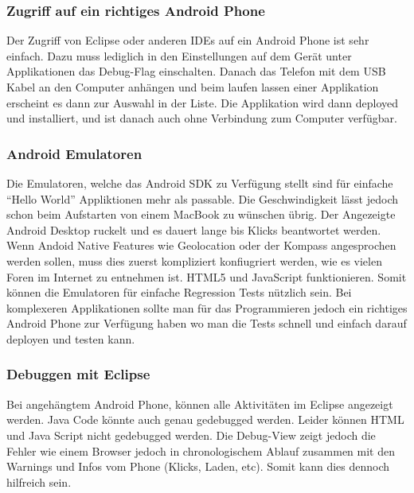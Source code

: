 \subsubsection{Zugriff auf ein richtiges Android Phone} %
\label{ssub:Zugriff auf ein richtiges Android Phone}
Der Zugriff von Eclipse oder anderen IDEs auf ein Android Phone ist sehr einfach. Dazu muss lediglich in den Einstellungen auf dem Gerät unter Applikationen das Debug-Flag einschalten. Danach das Telefon mit dem USB Kabel an den Computer anhängen und beim laufen lassen einer Applikation erscheint es dann zur Auswahl in der Liste. Die Applikation wird dann deployed und installiert, und ist danach auch ohne Verbindung zum Computer verfügbar.

\subsubsection{Android Emulatoren} %
\label{ssub:Android Emulatoren}
Die Emulatoren, welche das Android SDK zu Verfügung stellt sind für einfache "`Hello World"' Appliktionen mehr als passable. Die Geschwindigkeit lässt jedoch schon beim Aufstarten von einem MacBook zu wünschen übrig. Der Angezeigte Android Desktop ruckelt und es dauert lange bis Klicks beantwortet werden. Wenn Andoid Native Features wie Geolocation oder der Kompass angesprochen werden sollen, muss dies zuerst kompliziert konfiugriert werden, wie es vielen Foren im Internet zu entnehmen ist. HTML5 und JavaScript funktionieren. Somit können die Emulatoren für einfache Regression Tests nützlich sein. Bei komplexeren Applikationen sollte man für das Programmieren jedoch ein richtiges Android Phone zur Verfügung haben wo man die Tests schnell und einfach darauf deployen und testen kann.

\subsubsection{Debuggen mit Eclipse} %
\label{ssub:Debuggen mit Eclipse}
Bei angehängtem Android Phone, können alle Aktivitäten im Eclipse angezeigt werden. Java Code könnte auch genau gedebugged werden. Leider können HTML und Java Script nicht gedebugged werden. Die Debug-View zeigt jedoch die Fehler wie einem Browser jedoch in chronologischem Ablauf zusammen mit den Warnings und Infos vom Phone (Klicks, Laden, etc). Somit kann dies dennoch hilfreich sein. 

